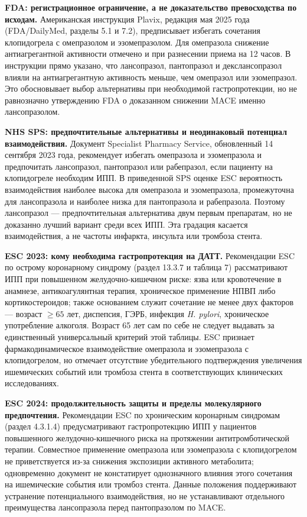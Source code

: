 \documentclass[11pt,a4paper,notitlepage]{report}
\newcommand{\Hp}{\textit{H. pylori}}
\newcommand{\src}[1]{\unskip\space\cite{#1}}
\begin{document}
\textbf{FDA: регистрационное ограничение, а не доказательство превосходства по исходам.} Американская инструкция Plavix, редакция мая 2025 года (FDA/DailyMed, разделы 5.1 и 7.2), предписывает избегать сочетания клопидогрела с омепразолом и эзомепразолом. Для омепразола снижение антиагрегантной активности отмечено и при разнесении приема на 12 часов. В инструкции прямо указано, что лансопразол, пантопразол и декслансопразол влияли на антиагрегантную активность меньше, чем омепразол или эзомепразол. Это обосновывает выбор альтернативы при необходимой гастропротекции, но не равнозначно утверждению FDA о доказанном снижении MACE именно лансопразолом.\src{cardioplavix2025}

\textbf{NHS SPS: предпочтительные альтернативы и неодинаковый потенциал взаимодействия.} Документ Specialist Pharmacy Service, обновленный 14 сентября 2023 года, рекомендует избегать омепразола и эзомепразола и предпочитать лансопразол, пантопразол или рабепразол, если пациенту на клопидогреле необходим ИПП. В приведенной SPS оценке ESC вероятность взаимодействия наиболее высока для омепразола и эзомепразола, промежуточна для лансопразола и наиболее низка для пантопразола и рабепразола. Поэтому лансопразол --- предпочтительная альтернатива двум первым препаратам, но не доказанно лучший вариант среди всех ИПП. Эта градация касается взаимодействия, а не частоты инфаркта, инсульта или тромбоза стента.\src{sps}

\textbf{ESC 2023: кому необходима гастропротекция на ДАТТ.} Рекомендации ESC по острому коронарному синдрому (раздел 13.3.7 и таблица 7) рассматривают ИПП при повышенном желудочно-кишечном риске: язва или кровотечение в анамнезе, антикоагулянтная терапия, хроническое применение НПВП либо кортикостероидов; также основанием служит сочетание не менее двух факторов --- возраст $\geq65$ лет, диспепсия, ГЭРБ, инфекция \Hp, хроническое употребление алкоголя. Возраст 65 лет сам по себе не следует выдавать за единственный универсальный критерий этой таблицы. ESC признает фармакодинамическое взаимодействие омепразола и эзомепразола с клопидогрелом, но отмечает отсутствие убедительного подтверждения увеличения ишемических событий или тромбоза стента в соответствующих клинических исследованиях.\src{cardioesc2023}

\textbf{ESC 2024: продолжительность защиты и пределы молекулярного предпочтения.} Рекомендации ESC по хроническим коронарным синдромам (раздел 4.3.1.4) предусматривают гастропротекцию ИПП у пациентов повышенного желудочно-кишечного риска на протяжении антитромботической терапии. Совместное применение омепразола или эзомепразола с клопидогрелом не приветствуется из-за снижения экспозиции активного метаболита; одновременно документ не констатирует однозначного влияния этого сочетания на ишемические события или тромбоз стента. Данные положения поддерживают устранение потенциального взаимодействия, но не устанавливают отдельного преимущества лансопразола перед пантопразолом по MACE.\src{cardioesc2024}
\end{document}
